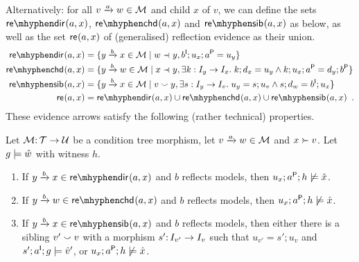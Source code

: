 Alternatively: for all $\trip vaw\in\cM$ and child $x$ of $v$, we can define the sets $\sdir{a,x}$, $\schd{a,x}$ and $\ssib{a,x}$ as below, as well as the set $\mathsf{re}_{}(a,x)$ of (generalised) reflection evidence as their union.
%
\begin{align*}
\sdir{a,x} ={} & \gensetof{\trip ybx\in \cM}{w\parentof y, b\I;u_x;a\P=u_y} \\
\schd{a,x} ={} & \gensetof{\trip ybw\in \cM}{x\parentof y, \exists k:I_y\to I_x\st k;d_x=u_y\wedge k;u_x;a\P=d_y;b\P} \\
\ssib{a,x} ={} & \gensetof{\trip ybx\in \cM}{v\sibling y, \exists s:I_y\to I_v\st u_y=s;u_v \wedge s;d_w=b\I;u_x} \\
\re{a,x} ={} & \sdir{a,x}\cup \schd{a,x} \cup \ssib{a,x} \enspace.
\end{align*}
%
These evidence arrows satisfy the following (rather technical) properties.
%
\begin{lemma}\label{lem:evidence}
Let  ${\mathcal{M}}{:}\, {\mathcal{T}}\rightarrow{\mathcal{U}}$ be a condition tree morphism, let $\trip vaw\in\cM$ and $x\childof v$. Let $g\models \hat w$ with witness $h$.
\begin{enumerate}
\item\label{re-dir} If $\trip ybx\in \sdir{a,x}$ and $b$ reflects models, then $u_x;a^{\mathsf P};h\not\models \hat x$.
\item\label{re-chd} If $\trip ybw\in \schd{a,x}$ and $b$ reflects models, then $u_x;a^{\mathsf P};h\not\models \hat x$.
\item\label{re-sib} If $\trip ybx\in \ssib{a,x}$ and $b$ reflects models, then either there is a sibling $v'\smallsmile v$ with a morphism $s'{:}\, I_{v'}\rightarrow I_v$ such that $u_{v'}=s';u_v$ and $s';a^{\mathsf I};g\models \hat v'$, or $u_x;a^{\mathsf P};h\not\models \hat x$.
\end{enumerate}
\end{lemma}
%
